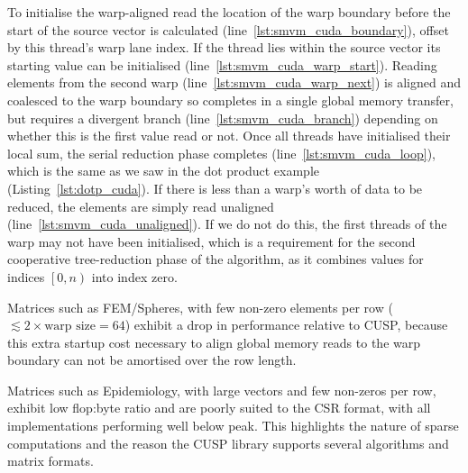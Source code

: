 To initialise the warp-aligned read the location of the warp boundary before the
start of the source vector is calculated (line~\ref{lst:smvm_cuda_boundary}),
offset by this thread's warp lane index. If the thread lies within the source
vector its starting value can be initialised
(line~\ref{lst:smvm_cuda_warp_start}). Reading elements from the second warp
(line~\ref{lst:smvm_cuda_warp_next}) is aligned and coalesced to the warp
boundary so completes in a single global memory transfer, but requires a
divergent branch (line~\ref{lst:smvm_cuda_branch}) depending on whether this is
the first value read or not. Once all threads have initialised their local sum,
the serial reduction phase completes (line~\ref{lst:smvm_cuda_loop}), which is
the same as we saw in the dot product example (Listing~\ref{lst:dotp_cuda}). If
there is less than a warp's worth of data to be reduced, the elements are simply
read unaligned (line~\ref{lst:smvm_cuda_unaligned}). If we do not do this, the
first threads of the warp may not have been initialised, which is a requirement
for the second cooperative tree-reduction phase of the algorithm, as it combines
values for indices $\left[0,n\right)$ into index zero.

Matrices such as FEM/Spheres, with few non-zero elements per row ($\lesssim 2
\times \text{warp size} = 64$) exhibit a drop in performance relative to CUSP,
because this extra startup cost necessary to align global memory reads to the
warp boundary can not be amortised over the row length.

Matrices such as Epidemiology, with large vectors and few non-zeros per row,
exhibit low flop:byte ratio and are poorly suited to the CSR format, with all
implementations performing well below peak. This highlights the nature of sparse
computations and the reason the CUSP library supports several algorithms and
matrix formats.

% 
% 

